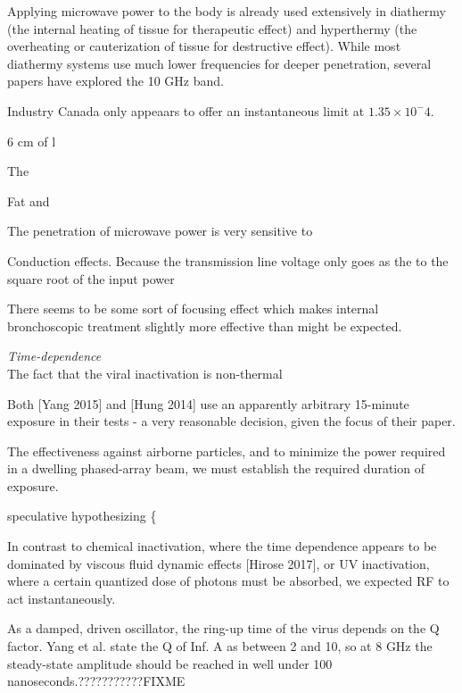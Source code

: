 \documentclass[fleqn,10pt]{article}
\begin{document}
Applying microwave power to the body is already used extensively in diathermy (the internal heating of tissue for therapeutic effect) and hyperthermy (the overheating or cauterization of tissue for destructive effect). While most diathermy systems use much lower frequencies for deeper penetration, several papers have explored the 10 GHz band. 

Industry Canada only appeaars to offer an instantaneous limit at $1.35 \times 10^-4$.

6 cm of l

The 

Fat and 

The penetration of microwave power is very sensitive to 

Conduction effects. Because the transmission line voltage only goes as the to the square root of the input power

There seems to be some sort of focusing effect which makes internal bronchoscopic treatment slightly more effective than might be expected.

\clearpage
\printbibliography[heading=none, title={}, keyword={standards}]



\clearpage
{\Large \it Time-dependence}\\

The fact that the viral inactivation is non-thermal

Both [Yang 2015] and [Hung 2014] use an apparently arbitrary 15-minute exposure in their tests - a very reasonable decision, given the focus of their paper. 

The effectiveness against airborne particles, and to minimize the power required in a dwelling phased-array beam, we must establish the required duration of exposure.

{\color{red} speculative hypothesizing \{ } 

In contrast to chemical inactivation, where the time dependence appears to be dominated by viscous fluid dynamic effects [Hirose 2017], or UV inactivation, where a certain quantized dose of photons must be absorbed, we expected RF to act instantaneously.

As a damped, driven oscillator, the ring-up time of the virus depends on the Q factor. Yang et al. state the Q of Inf. A as between 2 and 10, so at 8 GHz the steady-state amplitude should be reached in well under 100 nanoseconds.???????????FIXME
\end{document}
